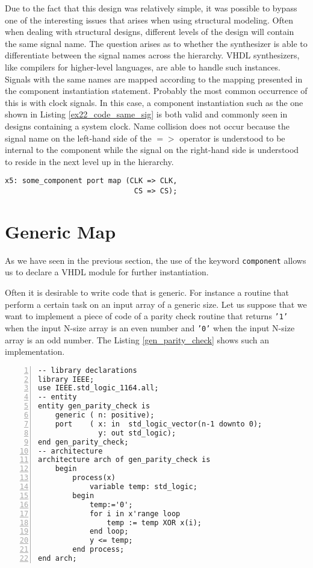 Due to the fact that this design was relatively simple, it was possible to bypass one of the interesting issues that arises when using structural modeling. Often when dealing with structural designs, different levels of the design will contain the same signal name. The question arises as to whether the synthesizer is able to differentiate between the signal names across the hierarchy. VHDL synthesizers, like compilers for higher-level languages, are able to handle such instances. Signals with the same names are mapped according to the mapping presented in the component instantiation statement. Probably the most common occurrence of this is with clock signals. In this case, a component instantiation such as the one shown in Listing \ref{ex22_code_same_sig} is both valid and commonly seen in designs containing a system clock. Name collision does not occur because the signal name on the left-hand side of the $=>$ operator is understood to be internal to the component while the signal on the right-hand side is understood to reside in the next level up in the hierarchy.

\noindent
\begin{minipage}{0.99\linewidth}
\begin{lstlisting}[label=ex22_code_same_sig, caption=Example of the same signal name crossing hierarchical boundaries.]
x5: some_component port map (CLK => CLK,
                              CS => CS); 
\end{lstlisting}
\end{minipage}


\section{Generic Map}
As we have seen in the previous section, the use of the keyword \texttt{component} allows us to declare a VHDL module for further instantiation.

Often it is desirable to write code that is generic. For instance a routine that perform a certain task on an input array of a generic size. Let us suppose that we want to implement a piece of code of a parity check routine that returns \texttt{'1'} when the input N-size array is an even number and \texttt{'0'} when the input N-size array is an odd number. The Listing \ref{gen_parity_check} shows such an implementation.

\noindent
\begin{minipage}{0.99\linewidth}
\begin{lstlisting}[numbers=left, label=gen_parity_check, caption= Parity check implementation with generic input array size.]
-- library declarations
library IEEE;
use IEEE.std_logic_1164.all;
-- entity
entity gen_parity_check is
    generic ( n: positive);
    port    ( x: in  std_logic_vector(n-1 downto 0);
              y: out std_logic);
end gen_parity_check;
-- architecture
architecture arch of gen_parity_check is
    begin
        process(x)
            variable temp: std_logic;
        begin
            temp:='0';
            for i in x'range loop
                temp := temp XOR x(i);
            end loop;
            y <= temp;
        end process;
end arch;
\end{lstlisting}
\end{minipage}


